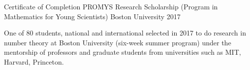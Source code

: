 \begin{cventries}
    \cventry
    {Certificate of Completion} %
    {PROMYS Research Scholarship (Program in Mathematics for Young Scientists)} %
    {Boston University} %
    {2017} %
    {
    \begin{cvitems}
    \item One of 80 students, national and international selected in 2017 to do research in number theory at Boston University (six-week summer program) under the mentorship of professors and graduate students from universities such as MIT, Harvard, Princeton.
    \end{cvitems}
    }


\iffalse
  \cventry
    {} %
    {Berkeley City College} %
    {Berkeley, California} %
    {2016-2017} %
    {
    \begin{itemize}
    \item Chemistry
    \item Calculus III (Multivariable)
    \item GPA: 5.0
    \end{itemize}
    }
    
    \cventry
    {} %
    {MIT OpenCourseWare} %
    {} %
    {2014-2018} %
    {
    \begin{itemize}
    \item Mathematics for Computer Science (6.042)
    \item Introduction to Algorithms (6.006)
    \end{itemize}
    }
    \fi
    
\end{cventries}
